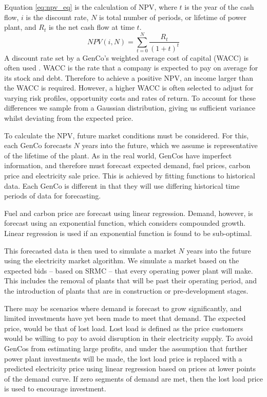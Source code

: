 Equation \ref{eq:npv_eq} is the calculation of NPV, where $t$ is the year of the cash flow, $i$ is the discount rate, $N$ is total number of periods, or lifetime of power plant, and $R_t$ is the net cash flow at time $t$.
\begin{equation} \label{eq:npv_eq}
NPV(i, N) = \sum_{t=0}^{N}\frac{R_t}{(1+t)^t}
\end{equation}
A discount rate set by a GenCo's weighted average cost of capital (WACC) is often used \cite{KincheloeStephenC1990TWAC}. WACC is the rate that a company is expected to pay on average for its stock and debt. Therefore to achieve a positive NPV, an income larger than the WACC is required. However, a higher WACC is often selected to adjust for varying risk profiles, opportunity costs and rates of return. To account for these differences we sample from a Gaussian distribution, giving us sufficient variance whilst deviating from the expected price.

To calculate the NPV, future market conditions must be considered. For this, each GenCo forecasts $N$ years into the future, which we assume is representative of the lifetime of the plant. As in the real world, GenCos have imperfect information, and therefore must forecast expected demand, fuel prices, carbon price and electricity sale price. This is achieved by fitting functions to historical data. Each GenCo is different in that they will use differing historical time periods of data for forecasting.

Fuel and carbon price are forecast using linear regression. Demand, however, is forecast using an exponential function, which considers compounded growth. Linear regression is used if an exponential function is found to be sub-optimal.

This forecasted data is then used to simulate a market $N$ years into the future using the electricity market algorithm. We simulate a market based on the expected bids -- based on SRMC -- that every operating power plant will make. This includes the removal of plants that will be past their operating period, and the introduction of plants that are in construction or pre-development stages. 

There may be scenarios where demand is forecast to grow significantly, and limited investments have yet been made to meet that demand. The expected price, would be that of lost load. Lost load is defined as the price customers would be willing to pay to avoid disruption in their electricity supply. To avoid GenCos from estimating large profits, and under the assumption that further power plant investments will be made, the lost load price is replaced with a predicted electricity price using linear regression based on prices at lower points of the demand curve. If zero segments of demand are met, then the  lost load price is used to encourage investment. 


